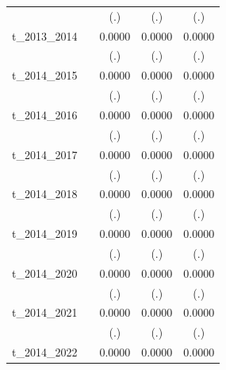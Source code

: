 \begin{table}[htbp]
\begin{tabular}{l*{4}{c}}
            &                     &         (.)         &         (.)         &         (.)         \\
[1em]
t\_2013\_2014 &                     &      0.0000         &      0.0000         &      0.0000         \\
            &                     &         (.)         &         (.)         &         (.)         \\
[1em]
t\_2014\_2015 &                     &      0.0000         &      0.0000         &      0.0000         \\
            &                     &         (.)         &         (.)         &         (.)         \\
[1em]
t\_2014\_2016 &                     &      0.0000         &      0.0000         &      0.0000         \\
            &                     &         (.)         &         (.)         &         (.)         \\
[1em]
t\_2014\_2017 &                     &      0.0000         &      0.0000         &      0.0000         \\
            &                     &         (.)         &         (.)         &         (.)         \\
[1em]
t\_2014\_2018 &                     &      0.0000         &      0.0000         &      0.0000         \\
            &                     &         (.)         &         (.)         &         (.)         \\
[1em]
t\_2014\_2019 &                     &      0.0000         &      0.0000         &      0.0000         \\
            &                     &         (.)         &         (.)         &         (.)         \\
[1em]
t\_2014\_2020 &                     &      0.0000         &      0.0000         &      0.0000         \\
            &                     &         (.)         &         (.)         &         (.)         \\
[1em]
t\_2014\_2021 &                     &      0.0000         &      0.0000         &      0.0000         \\
            &                     &         (.)         &         (.)         &         (.)         \\
[1em]
t\_2014\_2022 &                     &      0.0000         &      0.0000         &      0.0000         \\

\end{tabular}
\end{table}

